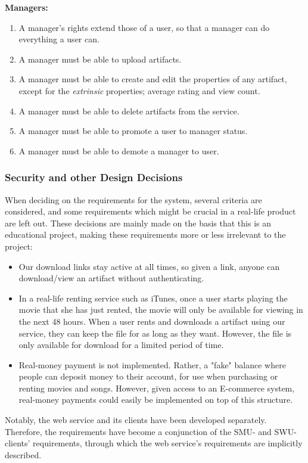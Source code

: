 \textbf{Managers:}
\begin{enumerate}
\setcounter{enumi}{\theenumTemp}
\item A manager's rights extend those of a user, so that a manager can do
	everything a user can.
\item A manager must be able to upload artifacts.
\item A manager must be able to create and edit the properties of any artifact,
	except for the \emph{extrinsic} properties; average rating and view
	count.
\item A manager must be able to delete artifacts from the service.
\item A manager must be able to promote a user to manager status.
\item A manager must be able to demote a manager to user.
\end{enumerate}

\subsubsection{Security and other Design Decisions}
When deciding on the requirements for the system, several criteria are
considered, and some requirements which might be crucial in a real-life product
are left out. These decisions are mainly made on the basis that this is an
educational project, making these requirements more or less irrelevant to the
project:

\begin{itemize}
\item Our download links stay active at all times, so given a link, 
	anyone can download/view an artifact without authenticating.
\item In a real-life renting service such as iTunes, once a user starts playing
	the movie that she has just rented, the movie will only be available
	for viewing in the next 48 hours. When a user rents and downloads a
	artifact using our service, they can keep the file for as long as they
	want. However, the file is only available for download for a limited
	period of time.
\item Real-money payment is not implemented. Rather, a "fake" balance where
	people can deposit money to their account, for use when purchasing or
	renting movies and songs. However, given access to an E-commerce
	system, real-money payments could easily be implemented on top of this
	structure.
\end{itemize}

Notably, the web service and its clients have been developed separately.
Therefore, the requirements have become a conjunction of the SMU- and
SWU-clients' requirements, through which the web service's requirements are
implicitly described.

